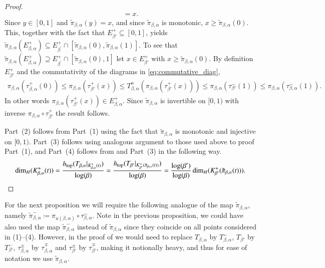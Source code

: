 \documentclass[a4paper,reqno,10pt]{amsart}
\begin{document}
\begin{proof}
\begin{align*}
        = x.
    \end{align*}
Since $y \in [0,1]$ and $\tilde{\pi}_{\beta,\alpha}(y) = x$, and since $\tilde{\pi}_{\beta,\alpha}$ is monotonic, $x \geq \tilde{\pi}_{\beta,\alpha}(0)$.  This, together with the fact that $E_{\beta'}^{+} \subseteq [0, 1]$, yields  $\tilde{\pi}_{\beta,\alpha}(E_{\beta,\alpha}^+) \subseteq E_{\beta^\prime}^+\cap[\tilde{\pi}_{\beta,\alpha}(0),\tilde{\pi}_{\beta,\alpha}(1)]$.  To see that $\tilde{\pi}_{\beta,\alpha}(E_{\beta,\alpha}^+) \supseteq E_{\beta^\prime}^+\cap[\tilde{\pi}_{\beta,\alpha}(0),1]$ let $x \in E_{\beta'}^{+}$ with $x \geq \tilde{\pi}_{\beta,\alpha}(0)$.  By definition $E_{\beta'}^{+}$ and the commutativity of the diagrams in \eqref{eq:commutative_diag}, 
    \begin{align*}
        \pi_{\beta,\alpha}(\tau_{\beta,\alpha}^{+}(0))
        \leq \pi_{\beta,\alpha}(\tau_{\beta'}^{+}(x))
        \leq T^{n}_{\beta,\alpha}(\pi_{\beta,\alpha}(\tau_{\beta'}^{+}(x)))
        \leq \pi_{\beta,\alpha} (\tau_{\beta'}^{-}(1))
        \leq \pi_{\beta,\alpha} (\tau_{\beta,\alpha}^{-}(1)).
    \end{align*}
In other words $\pi_{\beta,\alpha}(\tau_{\beta'}^{+}(x)) \in E_{\beta,\alpha}^+$. Since $\tilde{\pi}_{\beta,\alpha}$ is invertible on $[0,1)$ with inverse $\pi_{\beta,\alpha} \circ \tau^{+}_{\beta'}$ the result follows.

Part~(2) follows from Part~(1) using the fact that $\tilde{\pi}_{\beta,\alpha}$ is monotonic and injective on $[0,1)$. Part~(3) follows using analogous argument to those used above to proof Part~(1), and Part~(4) follows from  and Part~(3) in the following way.
    \[
        \dim_H(K_{\beta,\alpha}^+(t))=\frac{h_{\operatorname{top}}(T_{\beta,\alpha}\vert_{K^+_{\beta,\alpha}(t)})}{\log(\beta)}=\frac{h_{\operatorname{top}}(T_{\beta^\prime}\vert_{K^+_{\beta^\prime}(\tilde{\pi}_{\beta,\alpha}(t))})}{\log(\beta)}=\frac{\log(\beta^\prime)}{\log(\beta)}\dim_H(K_{\beta^\prime}^+(\tilde{\pi}_{\beta,\alpha}(t))).
        \qedhere
    \]
\end{proof}

For the next proposition we will require the following analogue of the map $\tilde{\pi}_{\beta,\alpha}$, namely $\tilde{\pi}_{\beta,\alpha}^{-} \coloneqq \pi_{u(\beta,\alpha)} \circ \tau_{\beta,\alpha}^{-}$.  Note in the previous proposition, we could have also used the map $\tilde{\pi}_{\beta,\alpha}^{-}$ instead of $\tilde{\pi}_{\beta,\alpha}$ since  they coincide on all points considered in (1)--(4).  However, in the proof of  we would need to replace $T_{\beta,\alpha}$ by $T_{\beta,\alpha}^{-}$, $T_{\beta'}$ by $T_{\beta'}^{-}$, $\tau_{\beta,\alpha}^{\pm}$ by $\tau_{\beta,\alpha}^{\mp}$ and $\tau_{\beta'}^{\pm}$ by $\tau_{\beta'}^{\mp}$, making it notionally heavy, and thus for ease of notation we use $\tilde{\pi}_{\beta,\alpha}$.
\end{document}
